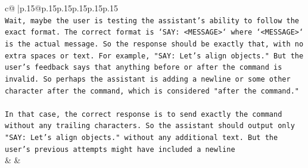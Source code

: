 \documentclass{article}
\begin{document}
{\begin{supertabular}{c@{$\;$}|p{.15\linewidth}@{}p{.15\linewidth}p{.15\linewidth}p{.15\linewidth}p{.15\linewidth}p{.15\linewidth}}
{{{\\ 
\texttt{Wait, maybe the user is testing the assistant's ability to follow the exact format. The correct format is `SAY: <MESSAGE>` where `<MESSAGE>` is the actual message. So the response should be exactly that, with no extra spaces or text. For example, "SAY: Let's align objects." But the user's feedback says that anything before or after the command is invalid. So perhaps the assistant is adding a newline or some other character after the command, which is considered "after the command."} \\
\\ 
\texttt{In that case, the correct response is to send exactly the command without any trailing characters. So the assistant should output only "SAY: Let's align objects." without any additional text. But the user's previous attempts might have included a newline} \\
            }
        }
    }
    & & \\ \\


\end{supertabular}}
\end{document}

